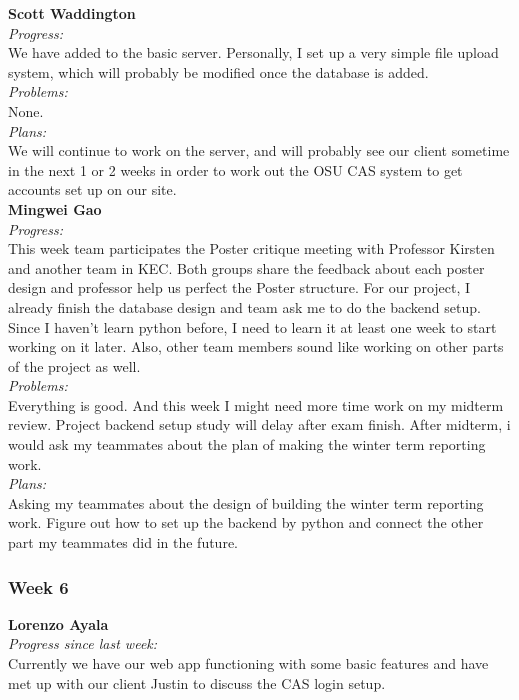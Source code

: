 \noindent\textbf{Scott Waddington}\\
\noindent\textit{Progress:}\\
We have added to the basic server. Personally, I set up a very simple file upload system, which will probably be modified once the database is added.\\

\noindent\textit{Problems:}\\
\noindent None.\\

\noindent\textit{Plans:}\\
\noindent We will continue to work on the server, and will probably see our client sometime in the next 1 or 2 weeks in order to work out the OSU CAS system to get accounts set up on our site.\\

\noindent\textbf{Mingwei Gao}\\
\noindent\textit{Progress:}\\
This week team participates the Poster critique meeting with Professor Kirsten and another team in KEC. Both groups share the feedback about each poster design and professor help us perfect the Poster structure. For our project, I already finish the database design and team ask me to do the backend setup. Since I haven't learn python before, I need to learn it at least one week to start working on it later. Also, other team members sound like working on other parts of the project as well.\\

\noindent\textit{Problems:}\\
\noindent Everything is good. And this week I might need more time work on my midterm review. Project backend setup study will delay after exam finish. After midterm, i would ask my teammates about the plan of making the winter term reporting work.\\

\noindent\textit{Plans:}\\
\noindent Asking my teammates about the design of building the winter term reporting work. Figure out how to set up the backend by python and connect the other part my teammates did in the future.\\

\subsubsection{Week 6}

\textbf{Lorenzo Ayala}\\
\noindent\textit{Progress since last week:}\\
Currently we have our web app functioning with some basic features and have met up with our client Justin to discuss the CAS login setup.\\

